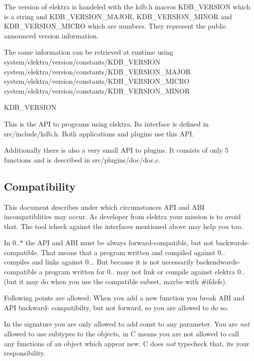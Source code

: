 The version of elektra is handeled with the kdb.\+h macros K\+D\+B\+\_\+\+V\+E\+R\+S\+I\+O\+N which is a string and K\+D\+B\+\_\+\+V\+E\+R\+S\+I\+O\+N\+\_\+\+M\+A\+J\+O\+R, K\+D\+B\+\_\+\+V\+E\+R\+S\+I\+O\+N\+\_\+\+M\+I\+N\+O\+R and K\+D\+B\+\_\+\+V\+E\+R\+S\+I\+O\+N\+\_\+\+M\+I\+C\+R\+O which are numbers. They represent the public announced version information.

The same information can be retrieved at runtime using system/elektra/version/constants/\+K\+D\+B\+\_\+\+V\+E\+R\+S\+I\+O\+N system/elektra/version/constants/\+K\+D\+B\+\_\+\+V\+E\+R\+S\+I\+O\+N\+\_\+\+M\+A\+J\+O\+R system/elektra/version/constants/\+K\+D\+B\+\_\+\+V\+E\+R\+S\+I\+O\+N\+\_\+\+M\+I\+C\+R\+O system/elektra/version/constants/\+K\+D\+B\+\_\+\+V\+E\+R\+S\+I\+O\+N\+\_\+\+M\+I\+N\+O\+R

K\+D\+B\+\_\+\+V\+E\+R\+S\+I\+O\+N

This is the A\+P\+I to programs using elektra. Its interface is defined in src/include/kdb.\+h. Both applications and plugins use this A\+P\+I.

Additionally there is also a very small A\+P\+I to plugins. It consists of only 5 functions and is described in src/plugins/doc/doc.\+c.

\subsection*{Compatibility}

This document describes under which circumstances A\+P\+I and A\+B\+I incompatiblities may occur. As developer from elektra your mission is to avoid that. The tool icheck against the interfaces mentioned above may help you too.

In 0..$\ast$ the A\+P\+I and A\+B\+I must be always forward-\/compatible, but not backwards-\/compatible. That means that a program written and compiled against 0.. compiles and links against 0... But because it is not necessarily backendwards-\/compatible a program written for 0.. may not link or compile against elektra 0.. (but it may do when you use the compatible subset, maybe with \#ifdefs).

Following points are allowed\+: When you add a new function you break A\+B\+I and A\+P\+I backward-\/ compatibilty, but not forward, so you are allowed to do so.

In the signature you are only allowed to add const to any parameter. You are {\itshape not} allowed to use subtypes to the objects, in C means you are not allowed to call any functions of an object which appear new. C does {\itshape not} typecheck that, its your responsibility.

